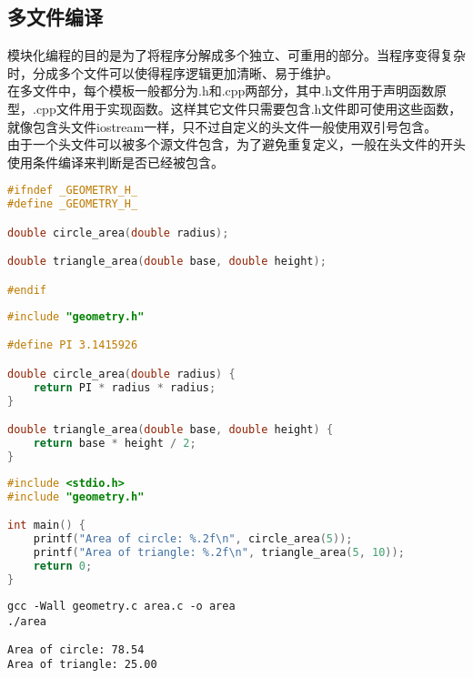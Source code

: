 \vspace{0.5cm}

\subsection{多文件编译}

模块化编程的目的是为了将程序分解成多个独立、可重用的部分。当程序变得复杂时，分成多个文件可以使得程序逻辑更加清晰、易于维护。\\

在多文件中，每个模板一般都分为.h和.cpp两部分，其中.h文件用于声明函数原型，.cpp文件用于实现函数。这样其它文件只需要包含.h文件即可使用这些函数，就像包含头文件iostream一样，只不过自定义的头文件一般使用双引号包含。\\

由于一个头文件可以被多个源文件包含，为了避免重复定义，一般在头文件的开头使用条件编译来判断是否已经被包含。\\


\begin{lstlisting}[language=C, title=geometry.h]
#ifndef _GEOMETRY_H_
#define _GEOMETRY_H_

double circle_area(double radius);

double triangle_area(double base, double height);

#endif
\end{lstlisting}

\begin{lstlisting}[language=C, title=geometry.c]
#include "geometry.h"

#define PI 3.1415926

double circle_area(double radius) {
    return PI * radius * radius;
}

double triangle_area(double base, double height) {
    return base * height / 2;
}
\end{lstlisting}

\begin{lstlisting}[language=C, title=area.c]
#include <stdio.h>
#include "geometry.h"

int main() {
    printf("Area of circle: %.2f\n", circle_area(5));
    printf("Area of triangle: %.2f\n", triangle_area(5, 10));
    return 0;
}
\end{lstlisting}

\vspace{-0.5cm}

\begin{lstlisting}
gcc -Wall geometry.c area.c -o area
./area
\end{lstlisting}

\begin{tcolorbox}
    \begin{verbatim}
Area of circle: 78.54
Area of triangle: 25.00
	\end{verbatim}
\end{tcolorbox}

\newpage
